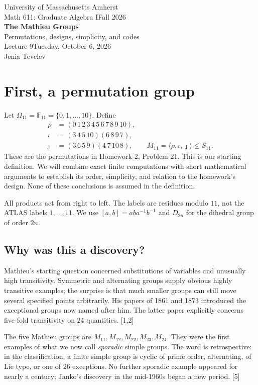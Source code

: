 \documentclass[12pt,letterpaper]{article}
\theoremstyle{definition}
\theoremstyle{remark}
\newcommand{\F}{\mathbb F}\newcommand{\Z}{\mathbb Z}
\begin{document}
\begin{center}
{\large University of Massachusetts Amherst}\\[3pt]
{\large Math 611: Graduate Algebra I\quad Fall 2026}\\[7pt]
{\LARGE\bfseries The Mathieu Groups}\\[4pt]
{\large Permutations, designs, simplicity, and codes}\\[6pt]
Lecture 9\quad Tuesday, October 6, 2026\\[3pt]
Jenia Tevelev
\end{center}


\hypertarget{overview}{}\hypertarget{permutations}{}
\section{First, a permutation group}

Let $\Omega_{11}=\F_{11}=\{0,1,\ldots,10\}$. Define
\[
\begin{aligned}
 \rho&=(0\,1\,2\,3\,4\,5\,6\,7\,8\,9\,10),\\
 \iota&=(3\,4\,5\,10)(6\,8\,9\,7),\\
 \jmath&=(3\,6\,5\,9)(4\,7\,10\,8),\qquad
 \boxed{M_{11}=\langle\rho,\iota,\jmath\rangle\le S_{11}.}
\end{aligned}
\]
These are the permutations in Homework 2, Problem 21. This is our starting definition. We will combine exact finite computations with short mathematical arguments to establish its order, simplicity, and relation to the homework's design. None of these conclusions is assumed in the definition.

All products act from right to left. The labels are residues modulo $11$, not the ATLAS labels $1,\ldots,11$. We use $[a,b]=aba^{-1}b^{-1}$ and $D_{2n}$ for the dihedral group of order $2n$.

\subsection*{Why was this a discovery?}
Mathieu's starting question concerned substitutions of variables and unusually high transitivity. Symmetric and alternating groups supply obvious highly transitive examples; the surprise is that much smaller groups can still move several specified points arbitrarily. His papers of 1861 and 1873 introduced the exceptional groups now named after him. The latter paper explicitly concerns five-fold transitivity on 24 quantities. [1,2]

The five Mathieu groups are $M_{11},M_{12},M_{22},M_{23},M_{24}$. They were the first examples of what we now call \emph{sporadic} simple groups. The word is retrospective: in the classification, a finite simple group is cyclic of prime order, alternating, of Lie type, or one of 26 exceptions. No further sporadic example appeared for nearly a century; Janko's discovery in the mid-1960s began a new period. [5]
\end{document}
